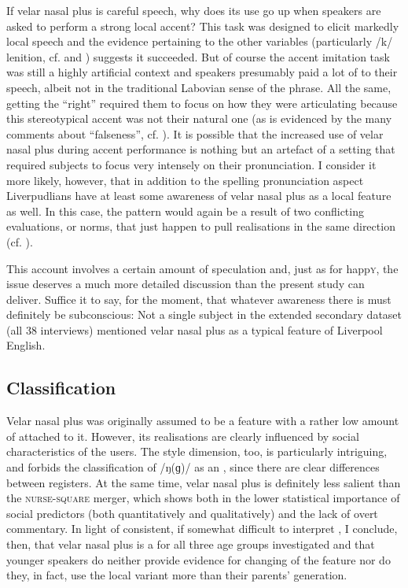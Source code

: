 If velar nasal plus is careful speech, why does its use go up when speakers are asked to perform a strong local accent?
This task was designed to elicit markedly local speech and the evidence pertaining to the other variables (particularly /k/ lenition, cf.  and ) suggests it succeeded.
But of course the accent imitation task was still a highly artificial context and speakers presumably paid a lot of  to their speech, albeit not in the traditional Labovian sense of the phrase.
All the same, getting the  ``right'' required them to focus on how they were articulating because this stereotypical accent was not their natural one (as is evidenced by the many comments about ``falseness'', cf. ).
It is possible that the increased use of velar nasal plus during accent performance is nothing but an artefact of a setting that required subjects to focus very intensely on their pronunciation.
I consider it more likely, however, that in addition to the spelling pronunciation aspect Liverpudlians have at least some awareness of velar nasal plus as a local feature as well.
In this case, the  pattern would again be a result of two conflicting evaluations, or norms, that just happen to pull realisations in the same direction (cf. ).

This account involves a certain amount of speculation and, just as for happ\textsc{y}, the issue deserves a much more detailed discussion than the present study can deliver.
Suffice it to say, for the moment, that whatever awareness there is must definitely be subconscious: Not a single subject in the extended secondary dataset (all 38 interviews) mentioned velar nasal plus as a typical feature of Liverpool English.

\subsection{Classification}
\label{prod.disc.ng.classification}

Velar nasal plus was originally assumed to be a feature with a rather low amount of  attached to it.
However, its realisations are clearly influenced by social characteristics of the users.
The style dimension, too, is particularly intriguing, and forbids the classification of /ŋ(ɡ)/ as an , since there are clear differences between registers.
At the same time, velar nasal plus is definitely less salient than the \textsc{nurse}-\textsc{square} merger, which shows both in the lower statistical importance of social predictors (both quantitatively and qualitatively) and the lack of overt commentary.
In light of consistent, if somewhat difficult to interpret , I conclude, then, that velar nasal plus is a  for all three age groups investigated and that younger speakers do neither provide evidence for changing  of the feature nor do they, in fact, use the local variant more than their parents' generation.

